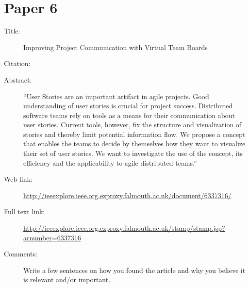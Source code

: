\documentclass{scrartcl}
\begin{document}
\section*{Paper 6}
\begin{description}
\item[Title:] Improving Project Communication with Virtual Team Boards
\item[Citation:] \cite{bibtex_key}
\item[Abstract:] ``User Stories are an important artifact in agile projects. Good understanding of user stories is crucial for project success. Distributed software teams rely on tools as a means for their communication about user stories. Current tools, however, fix the structure and visualization of stories and thereby limit potential information flow. We propose a concept that enables the teams to decide by themselves how they want to visualize their set of user stories. We want to investigate the use of the concept, its efficiency and the applicability to agile distributed teams.''
\item[Web link:] \url{http://ieeexplore.ieee.org.ezproxy.falmouth.ac.uk/document/6337316/}
\item[Full text link:] \url{http://ieeexplore.ieee.org.ezproxy.falmouth.ac.uk/stamp/stamp.jsp?arnumber=6337316}
\item[Comments:] Write a few sentences on how you found the article and why you believe it is relevant and/or important.
\end{description}




\end{document}
